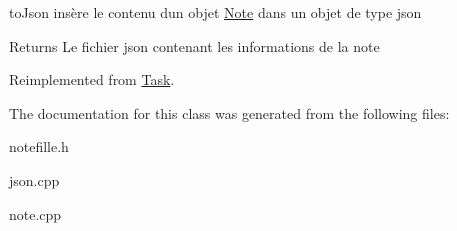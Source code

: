 to\+Json insère le contenu d\textquotesingle{}un objet \hyperlink{classNote}{Note} dans un objet de type json 

\begin{DoxyReturn}{Returns}
Le fichier json contenant les informations de la note 
\end{DoxyReturn}


Reimplemented from \hyperlink{classTask_af20f0085e2426cbf64955a03d8920400}{Task}.



The documentation for this class was generated from the following files\+:\begin{DoxyCompactItemize}
\item 
notefille.\+h\item 
json.\+cpp\item 
note.\+cpp\end{DoxyCompactItemize}
